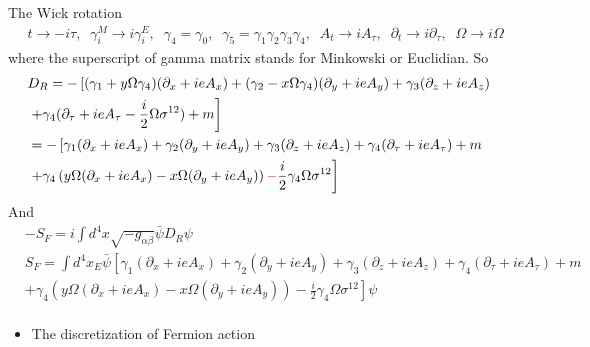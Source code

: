 The Wick rotation
\begin{equation}
\begin{split}
&t\to -i\tau,\;\;\gamma _i^{M}\to i\gamma _i^{E},\;\;\gamma _4=\gamma _0,\;\;\gamma _5=\gamma _1\gamma _2\gamma _3\gamma _4,\;\;A_t\to i A_{\tau},\;\;\partial _t\to i\partial _{\tau},\;\;\Omega \to i\Omega
\end{split}
\end{equation}
where the superscript of gamma matrix stands for Minkowski or Euclidian. So
\begin{equation}
\begin{split}
&D_R=-\left[(\gamma _1+y\Omega \gamma_4) (\partial _x+ieA_x)+(\gamma _2-x\Omega \gamma_4) (\partial _y+ieA_y)+\gamma _3 (\partial _z+ieA_z)\right.\\
&\left.+\gamma _4 (\partial _{\tau}+ieA_{\tau}-\frac{i}{2}\Omega \sigma ^{12})+m\right]\\
&=-\left[\gamma _1 (\partial _x+ieA_x)+\gamma _2(\partial _y+ieA_y)+\gamma _3 (\partial _z+ieA_z)+\gamma _4 (\partial _{\tau}+ieA_{\tau})+m\right.\\
&\left.+\gamma _4 \left(y\Omega(\partial _x+ieA_x)-x\Omega(\partial _y+ieA_y)\right)\textcolor[rgb]{1,0,0}{-}\frac{i}{2}\gamma _4\Omega \sigma ^{12}\right]\\
\end{split}
\end{equation}
And
\begin{equation}
\begin{split}
&-S_F=i\int d^4 x \sqrt{-g_{\alpha \beta}}\bar{\psi } D_R \psi\\
&S_F=\int d^4 x_E \bar{\psi } \left[\gamma _1 (\partial _x+ieA_x)+\gamma _2(\partial _y+ieA_y)+\gamma _3 (\partial _z+ieA_z)+\gamma _4 (\partial _{\tau}+ieA_{\tau})+m\right.\\
&\left.+\gamma _4 \left(y\Omega(\partial _x+ieA_x)-x\Omega(\partial _y+ieA_y)\right)-\frac{i}{2}\gamma _4\Omega \sigma ^{12}\right] \psi\\
\end{split}
\end{equation}

\begin{itemize}
  \item The discretization of Fermion action
\end{itemize}

